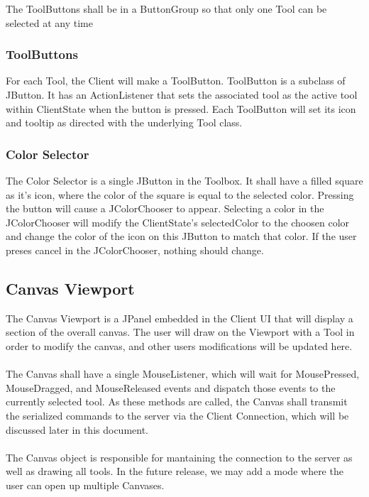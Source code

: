\documentclass[11pt,oneside,a4paper]{article}
\begin{document}
  The ToolButtons shall be in a ButtonGroup so that only one Tool can be
  selected at any time 

  \subsubsection{ToolButtons}
   For each Tool, the Client will make a ToolButton. ToolButton is a subclass
   of JButton.  It has an ActionListener that sets the associated tool as the
   active tool within ClientState when the button is pressed. Each ToolButton will
   set its icon and tooltip as directed with the underlying Tool class.

 \subsubsection{Color Selector}
 The Color Selector is a single JButton in the Toolbox. It shall have a filled
 square as it's icon, where the color of the square is equal to the selected
 color. Pressing the button will cause a JColorChooser to appear. Selecting a
 color in the JColorChooser will modify the ClientState's selectedColor to the
 choosen color and change the color of the icon on this JButton to match that
 color. If the user preses cancel in the JColorChooser, nothing should change.
 \subsection{Canvas Viewport}
  The Canvas Viewport is a JPanel embedded in the Client UI that will display a
  section of the overall canvas. The user will draw on the Viewport with a Tool
  in order to modify the canvas, and other users modifications will be updated
  here.\\\\
  The Canvas shall have a single MouseListener, which will wait for
  MousePressed, MouseDragged, and MouseReleased events and dispatch those events
  to the currently selected tool. As these methods are called, the Canvas shall
  transmit the serialized commands to the server via the Client Connection, which
  will be discussed later in this document. \\\\
  The Canvas object is responsible for mantaining the connection to the server
  as well as drawing all tools. In the future release, we may add a mode where the user
  can open up multiple Canvases. 
\end{document}

